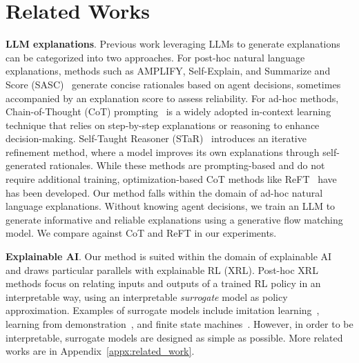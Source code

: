 \section{Related Works}
\textbf{LLM explanations}. 
Previous work leveraging LLMs to generate explanations can be categorized into two approaches. For post-hoc natural language explanations, methods such as AMPLIFY\cite{krishna2024post}, Self-Explain\cite{rajagopal2021selfexplain}, and Summarize and Score (SASC)~\cite{singh2023explaining} generate concise rationales based on agent decisions, sometimes accompanied by an explanation score to assess reliability. For ad-hoc methods, Chain-of-Thought (CoT) prompting~\cite{wei2022chain} is a widely adopted in-context learning technique that relies on step-by-step explanations or reasoning to enhance decision-making. Self-Taught Reasoner (STaR)~\cite{zelikman2022star} introduces an iterative refinement method, where a model improves its own explanations through self-generated rationales. While these methods are prompting-based and do not require additional training, optimization-based CoT methods like ReFT~\cite{trung2024reft} have has been developed. Our method falls within the domain of ad-hoc natural language explanations. Without knowing agent decisions, we train an LLM to generate informative and reliable explanations using a generative flow matching model. We compare against CoT and ReFT in our experiments. 

\textbf{Explainable AI}. Our method is suited within  the domain of explainable AI~\cite{arrieta2020explainable,carvalho2019machine,ehsan2019automated,gunning2017explainable,ras2018explanation,gilpin2018explaining} and draws particular parallels with explainable RL (XRL). Post-hoc XRL methods focus on relating inputs and outputs of a trained RL policy in an interpretable way, using an interpretable \emph{surrogate} model as policy approximation. Examples of surrogate models include imitation learning~\cite{abbeel2004apprenticeship}, learning from demonstration~\cite{argall2009survey}, and finite state machines~\cite{koul2018learning, danesh2021re}. However, in order to be interpretable, surrogate models are designed as simple as possible. More related works are in Appendix~\ref{appx:related_work}.

